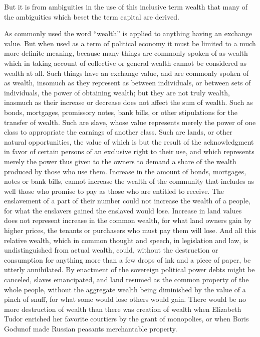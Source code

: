 But it is from ambiguities in the use of this inclusive term wealth that
many of the ambiguities which beset the term capital are derived.

As commonly used the word ``wealth'' is applied to anything having an
exchange value. But when used as a term of political economy it must be
limited to a much more definite meaning, because many things are
commonly spoken of as wealth which in taking account of collective or
general wealth cannot be considered as wealth at all. Such things have
an exchange value, and are commonly spoken of as wealth, insomuch as
they represent as between individuals, or between sets of individuals,
the power of obtaining wealth; but they are not truly wealth, inasmuch
as their increase or decrease does not affect the sum of wealth. Such as
bonds, mortgages, promissory notes, bank bills, or other stipulations
for the transfer of wealth. Such are slave, whose value represents
merely the power of one class to appropriate the earnings of another
class. Such are lands, or other natural opportunities, the value of
which is but the result of the acknowledgment in favor of certain
persons of an exclusive right to their use, and which represents merely
the power thus given to the owners to demand a share of the wealth
produced by those who use them. Increase in the amount of bonds,
mortgages, notes or bank bills, cannot increase the wealth of the
community that includes as well those who promise to pay as those who
are entitled to receive. The enslavement of a part of their number could
not increase the wealth of a people, for what the enslavers gained the
enslaved would lose. Increase in land values does not represent increase
in the common wealth, for what land owners gain by higher prices, the
tenants or purchasers who must pay them will lose. And all this relative
wealth, which in common thought and speech, in legislation and law, is
undistinguished from actual wealth, could, without the destruction or
consumption for anything more than a few drops of ink and a piece of
paper, be utterly annihilated. By enactment of the sovereign political
power debts might be canceled, slaves emancipated, and land resumed as
the common property of the whole people, without the aggregate wealth
being diminished by the value of a pinch of snuff, for what some would
lose others would gain. There would be no more destruction of wealth
than there was creation of wealth when Elizabeth Tudor enriched her
favorite courtiers by the grant of monopolies, or when Boris Godunof
made Russian peasants merchantable property.

